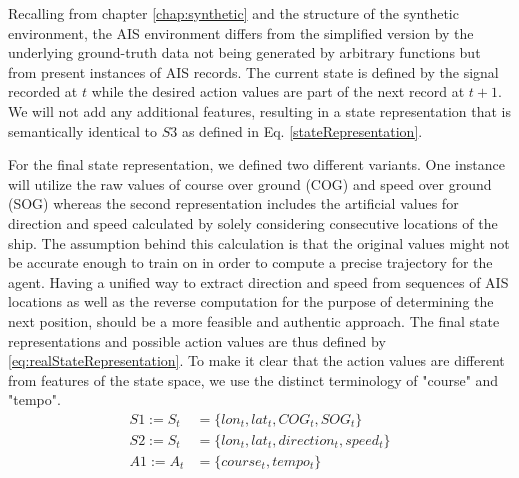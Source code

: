 Recalling from chapter \ref{chap:synthetic} and the structure of the synthetic environment, the AIS environment differs from the simplified version by the underlying ground-truth data not being generated by arbitrary functions but from present instances of AIS records. The current state is defined by the signal recorded at $t$ while the desired action values are part of the next record at $t+1$. We will not add any additional features, resulting in a state representation that is semantically identical to $S3$ as defined in Eq. \ref{stateRepresentation}.
\par
For the final state representation, we defined two different variants. One instance will utilize the raw values of course over ground (COG) and speed over ground (SOG) whereas the second representation includes the artificial values for direction and speed calculated by solely considering consecutive locations of the ship. The assumption behind this calculation is that the original values might not be accurate enough to train on in order to compute a precise trajectory for the agent. Having a unified way to extract direction and speed from sequences of AIS locations as well as the reverse computation for the purpose of determining the next position, should be a more feasible and authentic approach. The final state representations and possible action values are thus defined by \ref{eq:realStateRepresentation}. To make it clear that the action values are different from features of the state space, we use the distinct terminology of "course" and "tempo".
\begin{equation}
\begin{aligned}
    S1 := S_t &= \{lon_t, lat_t, COG_t, SOG_t\}
\\
    S2 := S_t &= \{lon_t,lat_t, direction_t, speed_t\}
\\
    A1 := A_t &= \{course_t, tempo_t\}
    \end{aligned}
\end{equation} \label{eq:realStateRepresentation}

